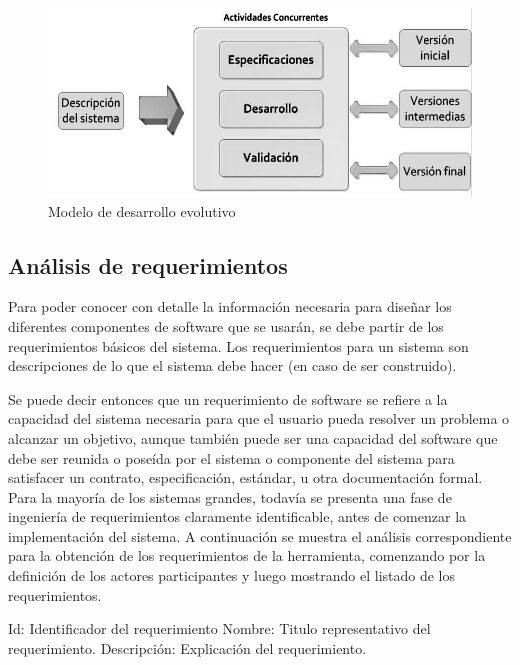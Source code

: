 \begin{figure}[H]
\centering
\centerline{\includegraphics[width=12cm, keepaspectratio]{pictures/picture14.png}}
\caption{Modelo de desarrollo evolutivo}
\end{figure}

\newpage
\subsection{Análisis de requerimientos}

Para poder conocer con detalle la información necesaria para diseñar los diferentes componentes de software que se usarán, se debe partir de los requerimientos básicos del sistema. Los requerimientos para un sistema son descripciones de lo que el sistema debe hacer (en caso de ser construido)\cite{A01}. 

\vspace{1em}

Se puede decir entonces que un requerimiento de software se refiere a la capacidad del sistema necesaria para que el usuario pueda resolver un problema o alcanzar un objetivo, aunque también puede ser una capacidad del software que debe ser reunida o poseída por el sistema o componente del sistema para satisfacer un contrato, especificación, estándar, u otra documentación formal. Para la mayoría de los sistemas grandes, todavía se presenta una fase de ingeniería de requerimientos claramente identificable, antes de comenzar la implementación del sistema\cite{A01}. A continuación se muestra el análisis correspondiente para la obtención de los requerimientos de la herramienta, comenzando por la definición de los actores participantes y luego mostrando el listado de los requerimientos.

\begin{outline}
\1 Id: Identificador del requerimiento
\1 Nombre: Titulo representativo del requerimiento.
\1 Descripción: Explicación del requerimiento.
\end{outline}

